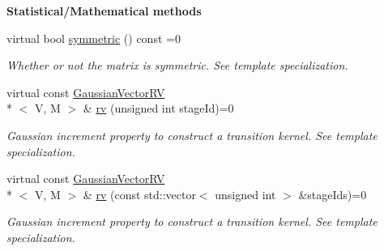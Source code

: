 \begin{Indent}{\bf Statistical/\-Mathematical methods}\par
\begin{DoxyCompactItemize}
\item 
virtual bool \hyperlink{class_q_u_e_s_o_1_1_base_t_k_group_ad0130349060d50b985c83b6bb1abc58e}{symmetric} () const =0
\begin{DoxyCompactList}\small\item\em Whether or not the matrix is symmetric. See template specialization. \end{DoxyCompactList}\item 
virtual const \hyperlink{class_q_u_e_s_o_1_1_gaussian_vector_r_v}{Gaussian\-Vector\-R\-V}\\*
$<$ V, M $>$ \& \hyperlink{class_q_u_e_s_o_1_1_base_t_k_group_a6bd8e0bec0105471aad8801cbf1a0851}{rv} (unsigned int stage\-Id)=0
\begin{DoxyCompactList}\small\item\em Gaussian increment property to construct a transition kernel. See template specialization. \end{DoxyCompactList}\item 
virtual const \hyperlink{class_q_u_e_s_o_1_1_gaussian_vector_r_v}{Gaussian\-Vector\-R\-V}\\*
$<$ V, M $>$ \& \hyperlink{class_q_u_e_s_o_1_1_base_t_k_group_a35eaf213217ec41a9d85b957db01a9ff}{rv} (const std\-::vector$<$ unsigned int $>$ \&stage\-Ids)=0
\begin{DoxyCompactList}\small\item\em Gaussian increment property to construct a transition kernel. See template specialization. \end{DoxyCompactList}\end{DoxyCompactItemize}
\end{Indent}
